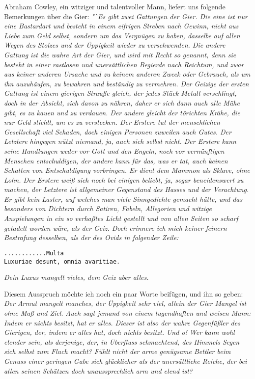 Abraham Cowley, ein witziger und talentvoller
Mann, liefert uns folgende
Bemerkungen über die Gier:
\textit{"`Es gibt zwei Gattungen der Gier. Die eine ist
nur eine Bastardart und besteht in einem eifrigen Streben nach Gewinn, nicht
aus Liebe zum Geld selbst, sondern um das Vergnügen zu haben, dasselbe auf
allen Wegen des Stolzes und der Üppigkeit wieder zu verschwenden. Die andere
Gattung ist die wahre Art der Gier, und wird mit Recht so genannt, denn sie
besteht in einer rastlosen und unersättlichen Begierde nach Reichtum, und zwar
aus keiner anderen Ursache und zu keinem anderen Zweck oder Gebrauch, als um
ihn auzuhäufen, zu bewahren und beständig zu vermehren. Der Geizige der ersten
Gattung ist einem gierigen Strauße 
gleich, der jedes Stück Metall verschlingt,
doch in der Absicht, sich davon zu nähren, daher er sich dann auch alle Mühe
gibt, es zu kauen und zu verdauen. Der andere gleicht der törichten Krähe, die
nur Geld stiehlt, um es zu verstecken.  Der
Erstere tut der menschlichen
Gesellschaft viel Schaden, doch einigen Personen zuweilen auch Gutes. Der
Letztere hingegen nützt niemand, ja, auch sich selbst nicht. Der Erstere kann
seine Handlungen weder vor Gott und den Engeln, noch vor
vernünftigen Menschen
entschuldigen, der andere kann für das, was er tat, auch keinen Schatten von
Entschuldigung vorbringen. Er dient dem Mammon als Sklave, ohne Lohn. Der
Erstere weiß sich noch bei einigen beliebt, ja, sogar beneidenswert zu machen,
der Letztere ist allgemeiner Gegenstand des Hasses und der Verachtung. Er gibt
kein Laster, auf welches man viele Sinngedichte gemacht hätte, und das
besonders von Dichtern durch Satiren, Fabeln, Allegorien und witzige
Anspielungen in ein so verhaßtes Licht gestellt und von allen Seiten so scharf
getadelt worden wäre, als der Geiz. Doch erinnere ich mich keiner feinern
Bestrafung desselben, als der des Ovids
in folgender Zeile:}

\medskip

\texttt{............Multa} \\
\texttt{Luxuriae desunt, omnia avaritiae.}

\medskip

\textit{Dein Luxus mangelt vieles, dem Geiz aber alles.}

\medskip

Diesem Ausspruch möchte ich noch ein paar Worte beifügen, und ihn so geben:
\textit{Der Armut mangelt manches, der Üppigkeit sehr viel,
allein der Gier Mangel ist ohne Maß und Ziel.}
\textit{Auch sagt jemand von einem tugendhaften und weisen Mann: Indem er
nichts
besitzt, hat er alles. Dieser ist also der wahre Gegenfüßler des Gierigen, der,
indem er alles hat, doch nichts besitzt. Und o! Wer kann wohl elender sein, als
derjenige, der, in Überfluss schmachtend, des Himmels Segen sich selbst zum
Fluch macht? Fühlt nicht der arme genügsame
Bettler beim Genuss einer geringen
Gabe sich glücklicher als der unersättliche Reiche, der bei allen seinen
Schätzen doch unaussprechlich arm und elend ist?}

